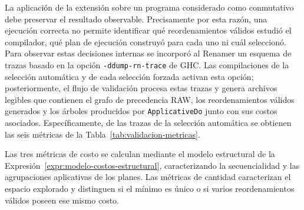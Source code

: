 La aplicación de la extensión sobre un programa considerado como conmutativo debe preservar el resultado observable. Precisamente por esta razón, una ejecución correcta no permite identificar qué reordenamientos válidos estudió el compilador, qué plan de ejecución construyó para cada uno ni cuál seleccionó. Para observar estas decisiones internas se incorporó al Renamer un esquema de trazas basado en la opción \texttt{-ddump-rn-trace} de \textsf{GHC}. Las compilaciones de la selección automática y de cada selección forzada activan esta opción; posteriormente, el flujo de validación procesa estas trazas y genera archivos legibles que contienen el grafo de precedencia RAW, los reordenamientos válidos generados y los árboles producidos por \texttt{ApplicativeDo} junto con sus costos asociados. Específicamente, de las trazas de la selección automática se obtienen las seis métricas de la Tabla~\ref{tab:validacion-metricas}.

\begin{table}[ht]
\centering
\TableSetup
{}
\caption{Métricas extraídas de las trazas del Renamer.}
\label{tab:validacion-metricas}
\end{table}

Las tres métricas de costo se calculan mediante el modelo estructural de la Expresión~\ref{expr:modelo-costos-estructural}, caracterizando la secuencialidad y las agrupaciones aplicativas de los planes. Las métricas de cantidad caracterizan el espacio explorado y distinguen si el mínimo es único o si varios reordenamientos válidos poseen ese mismo costo.


